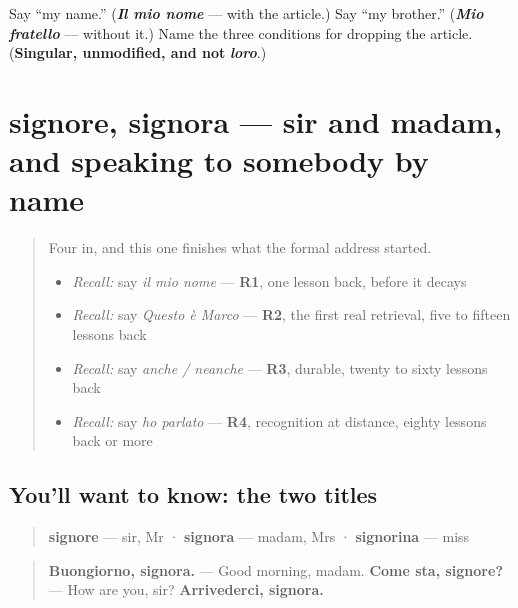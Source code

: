 \begin{tcolorbox}[breakable,colback=teal!4,colframe=teal!35!black,title={Before you move on}]
Say \textquotedblleft{}my name.\textquotedblright{} (\emph{\textbf{Il mio nome}} — with the article.) Say \textquotedblleft{}my brother.\textquotedblright{} (\emph{\textbf{Mio fratello}} — without it.) Name the three conditions for dropping the article. (\textbf{Singular, unmodified, and not} \emph{\textbf{loro}}.)
\end{tcolorbox}
\section[signore, signora]{signore, signora — sir and madam, and speaking to somebody by name}

\label{lesson:IT-C34-signore-signora}



\begin{quote}
Four in, and this one finishes what the formal address started.

\begin{itemize}
\raggedright
  \item \emph{Recall:} say \emph{il mio nome} — \textbf{R1}, one lesson back, before it decays
  \item \emph{Recall:} say \emph{Questo è Marco} — \textbf{R2}, the first real retrieval, five to fifteen lessons back
  \item \emph{Recall:} say \emph{anche / neanche} — \textbf{R3}, durable, twenty to sixty lessons back
  \item \emph{Recall:} say \emph{ho parlato} — \textbf{R4}, recognition at distance, eighty lessons back or more
\end{itemize}
\end{quote}

\subsection*{You'll want to know: the two titles}
\begin{quote}
\textbf{signore} — sir, Mr · \textbf{signora} — madam, Mrs · \textbf{signorina} — miss
\end{quote}

\begin{quote}
\textbf{Buongiorno, signora.} — Good morning, madam. \textbf{Come sta, signore?} — How are you, sir? \textbf{Arrivederci, signora.}
\end{quote}


